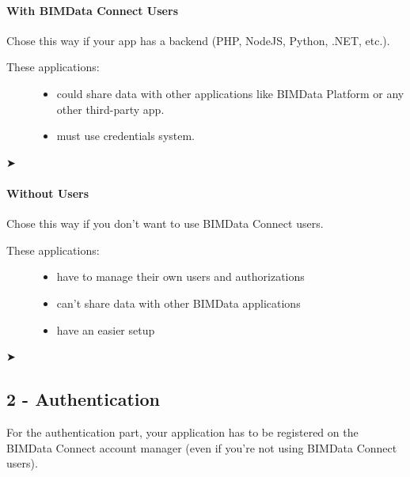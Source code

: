 \documentclass[a4paper,12pt,english]{sphinxmanual}
\begin{document}
\paragraph{With BIMData Connect Users}
\label{\detokenize{tutorials/guided_tour:with-bimdata-connect-users}}
Chose this way if your app has a backend (PHP, NodeJS, Python, .NET, etc.).
\begin{description}
\item[{These applications:}] \leavevmode\begin{itemize}
\item {} 
could share data with other applications like BIMData Platform or any other third-party app.

\item {} 
must use  credentials system.

\end{itemize}

\end{description}

➤ 


\paragraph{Without Users}
\label{\detokenize{tutorials/guided_tour:without-users}}
Chose this way if you don’t want to use BIMData Connect users.
\begin{description}
\item[{These applications:}] \leavevmode\begin{itemize}
\item {} 
have to manage their own users and authorizations

\item {} 
can’t share data with other BIMData applications

\item {} 
have an easier setup

\end{itemize}

\end{description}

➤ 


\subsection{2 - Authentication}
\label{\detokenize{tutorials/guided_tour:authentication}}
For the authentication part, your application has to be registered on the BIMData Connect account manager (even if you’re not using BIMData Connect users).
\end{document}
